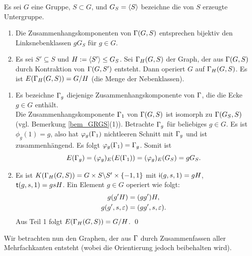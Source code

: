 \documentclass[a4paper, 12pt, twoside]{article}
\begin{document}
\PROP Es sei $G$ eine Gruppe, $S\subset G$, und $G_S=\langle S\rangle$
bezeichne die von $S$ erzeugte Untergruppe.
\begin{enumerate}
\item Die Zusammenhangskomponenten von $\Gamma(G,S)$ entsprechen
bijektiv den Linksnebenklassen $g G_S$ für $g\in G$.
\item Es sei $S'\subseteq S$ und $H:=\langle S'\rangle \leq G_S$.
Sei $\Gamma_H(G,S)$ der Graph, der aus $\Gamma(G,S)$ durch Kontraktion
von $\Gamma(G,S')$ entsteht.
Dann operiert $G$ auf $\Gamma_H(G,S)$.
Es ist $E(\Gamma_H(G,S)) = G/H$ (die Menge der Nebenklassen).
\end{enumerate}
\bew \begin{enumerate}
\item Es bezeichne $\Gamma_g$ diejenige Zusammenhangskomponente von
$\Gamma$, die die Ecke $g\in G$ enthält.\\
Die Zusammenhangskomponente $\Gamma_1$ von $\Gamma(G,S)$ ist isomorph
zu $\Gamma(G_S,S)$ (vgl. Bemerkung \ref{bem_GRGS}(1)).
Betrachte $\Gamma_g$ für beliebiges $g\in G$. Es ist $\phi_g(1)=g$,
also hat $\varphi_g(\Gamma_1)$ nichtleeren Schnitt mit $\Gamma_g$ und ist
zusammenhängend. Es folgt $\varphi_g(\Gamma_1)=\Gamma_g$.
Somit ist
\[
E(\Gamma_g)=(\varphi_g)_E(E(\Gamma_1))=(\varphi_g)_E(G_S) = g G_S.
\]
\item
Es ist $K(\Gamma_H(G,S))=G\times S\backslash S'\times\{-1,1\}$ mit
$\mathsf{i}(g,s,1)=gH$, $\mathsf{t}(g,s,1)=gsH$.
Ein Element $g\in G$ operiert wie folgt:
\begin{align*}
g(g'H) &= (gg')H, \\
g(g',s,\varepsilon) &= (gg',s,\varepsilon).
\end{align*}
Aus Teil 1 folgt $E(\Gamma_H(G,S))=G/H$.
\qed
\end{enumerate}

Wir betrachten nun den Graphen, der aus $\Gamma$ durch Zusammenfassen
aller Mehrfachkanten entsteht
(wobei die Orientierung jedoch beibehalten wird).
\end{document}
